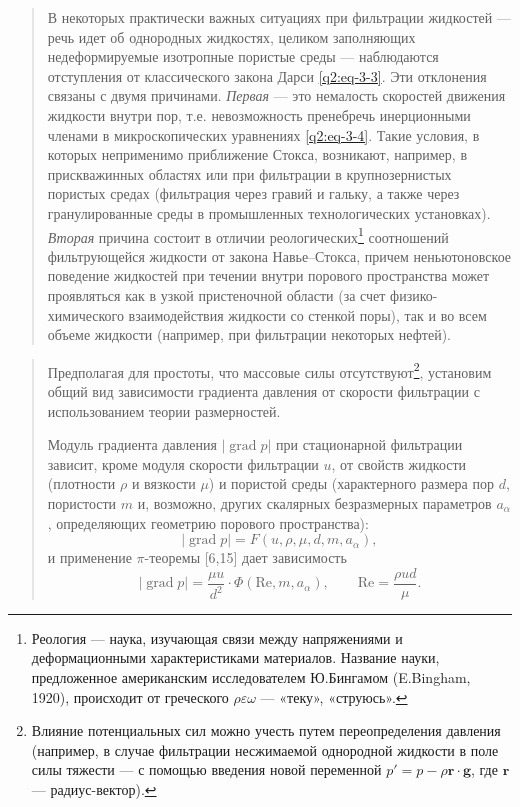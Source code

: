 \documentclass[12pt,a4paper]{article}
\DeclareMathOperator{\grad}{grad}
\newcommand{\Rey}{\mathrm{Re}}
\newenvironment{textquote}{\begin{quote}\sloppy}{\end{quote}}
\begin{document}
\begin{textquote}
В некоторых практически важных ситуациях при фильтрации жидкостей --- речь идет об однородных жидкостях, целиком заполняющих недеформируемые изотропные пористые среды --- наблюдаются отступления от классического закона Дарси \eqref{q2:eq-3-3}. Эти отклонения связаны с двумя причинами. \textit{Первая} --- это немалость скоростей движения жидкости внутри пор, т.е. невозможность пренебречь инерционными членами в микроскопических уравнениях \eqref{q2:eq-3-4}. Такие условия, в которых неприменимо приближение Стокса, возникают, например, в прискважинных областях или при фильтрации в крупнозернистых пористых средах (фильтрация через гравий и гальку, а также через гранулированные среды в промышленных технологических установках). \textit{Вторая} причина состоит в отличии реологических\footnote[1]{Реология --- наука, изучающая связи между напряжениями и деформационными характеристиками материалов. Название науки, предложенное американским исследователем Ю.Бингамом (E.Bingham, 1920), происходит от греческого $\rho\varepsilon\omega$ --- «теку», «струюсь».} соотношений фильтрующейся жидкости от закона Навье--Стокса, причем неньютоновское поведение жидкостей при течении внутри порового пространства может проявляться как в узкой пристеночной области (за счет физико-химического взаимодействия жидкости со стенкой поры), так и во всем объеме жидкости (например, при фильтрации некоторых нефтей).
\end{textquote}

\begin{textquote}
Предполагая для простоты, что массовые силы отсутствуют\footnote[2]{Влияние потенциальных сил можно учесть путем переопределения давления (например, в случае фильтрации несжимаемой однородной жидкости в поле силы тяжести --- с помощью введения новой переменной $p'=p-\rho\boldsymbol{r}\cdot\boldsymbol{g}$, где $\boldsymbol{r}$ --- радиус-вектор).}, установим общий вид зависимости градиента давления от скорости фильтрации с использованием теории размерностей.

Модуль градиента давления $|\grad p|$ при стационарной фильтрации зависит, кроме модуля скорости фильтрации $u$, от свойств жидкости (плотности $\rho$ и вязкости $\mu$) и пористой среды (характерного размера пор $d$, пористости $m$ и, возможно, других скалярных безразмерных параметров $a_\alpha$, определяющих геометрию
порового пространства):
\[
|\grad p|=F(u,\rho,\mu,d,m,a_\alpha),
\]
и применение $\pi$-теоремы [6,15] дает зависимость
\[
|\grad p|=\frac{\mu u}{d^2}\cdot\Phi(\Rey,m,a_\alpha),\qquad \Rey=\frac{\rho ud}{\mu}.
\]
\end{textquote}
\end{document}
